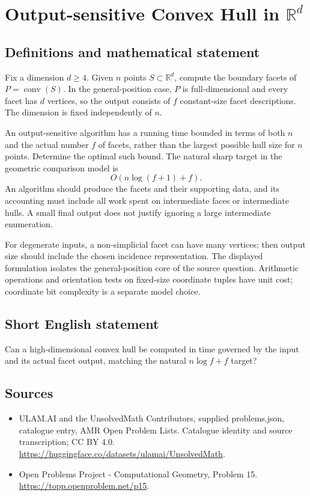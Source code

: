 \documentclass[11pt,a4paper]{article}
\begin{document}
\section*{Output-sensitive Convex Hull in $\mathbb{R}^d$}\label{statement}

\subsection{Definitions and mathematical statement}
Fix a dimension $d\ge4$. Given $n$ points $S\subset\mathbb R^d$, compute
the boundary facets of $P=\operatorname{conv}(S)$. In the general-position
case, $P$ is full-dimensional and every facet has $d$ vertices, so the
output consists of $f$ constant-size facet descriptions. The dimension
is fixed independently of $n$.

An output-sensitive algorithm has a running time bounded in terms of
both $n$ and the actual number $f$ of facets, rather than the largest
possible hull size for $n$ points. Determine the optimal such bound.
The natural sharp target in the geometric comparison model is
\[
                         O(n\log(f+1)+f).
\]
An algorithm should produce the facets and their supporting data, and
its accounting must include all work spent on intermediate faces or
intermediate hulls. A small final output does not justify ignoring a
large intermediate enumeration.

For degenerate inputs, a non-simplicial facet can have many vertices;
then output size should include the chosen incidence representation.
The displayed formulation isolates the general-position core of the
source question. Arithmetic operations and orientation tests on fixed-size
coordinate tuples have unit cost; coordinate bit complexity is a
separate model choice.
\subsection{Short English statement}
Can a high-dimensional convex hull be computed in time governed by
the input and its actual facet output, matching the natural
$n\log f+f$ target?
\subsection{Sources}
\begin{itemize}
\item[S1] ULAM.AI and the UnsolvedMath Contributors, supplied problems.json, catalogue entry, AMR Open Problem Lists. Catalogue identity and source transcription; CC BY 4.0.
\url{https://huggingface.co/datasets/ulamai/UnsolvedMath}.
\item[S2] Open Problems Project - Computational Geometry, Problem 15. 
\url{https://topp.openproblem.net/p15}.
\end{itemize}
\end{document}
